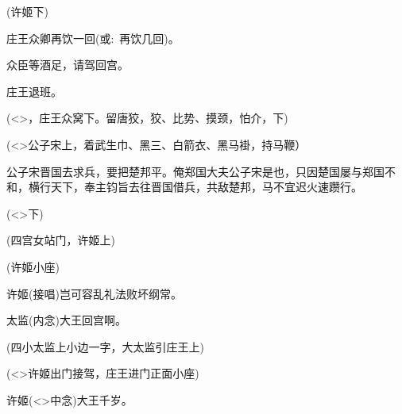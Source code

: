 {(许姬{\hwfs 下})

庄王\hspace{30pt}众卿再饮一回({\akai 或}:~再饮几回)。

众\hspace{40pt}臣等酒足，请驾回宫。

庄王\hspace{30pt}退班。

(\textless{}\!\textgreater{}，庄王众{\hwfs 窝下}。{\hwfs 留}唐狡，狡、{\hwfs 比势}、{\hwfs 摸颈}，{\hwfs 怕介}，{\hwfs 下})

\vspace{5pt}

(\textless{}\!\textgreater{}公子宋{\hwfs 上}，{\hwfs 着}武生巾、黑三、白箭衣、黑马褂，{\hwfs 持}马鞭）

公子宋\hspace{20pt}晋国去求兵，要把楚邦平。俺郑国大夫公子宋是也，只因楚国屡与郑国不和，横行天下，奉主钧旨去往晋国借兵，共敌楚邦，马不宜迟火速躜行。

(\textless{}\!\textgreater{}{\hwfs 下})

\vspace{5pt}

({\hwfs 四}宫女{\hwfs 站门}，许姬{\hwfs 上})


(许姬{\hwfs 小座})

许姬\hspace{30pt}({\akai 接唱})岂可容乱礼法败坏纲常。

太监\hspace{30pt}({\akai 内念})大王回宫啊。

({\hwfs 四}小太监{\hwfs 上小边一字}，大太监{\hwfs 引}庄王{\hwfs 上})


(\textless{}\!\textgreater{}许姬{\hwfs 出门接驾}，庄王{\hwfs 进门正面小座})

许姬\hspace{30pt}(\textless{}\!\textgreater{}{\hwfs 中}{\akai 念})大王千岁。

}
